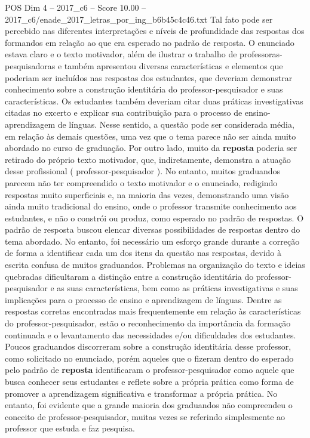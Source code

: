 \begin{textsample}{POS Dim 4 – 2017\_c6 – Score 10.00 – 2017\_c6/enade\_2017\_letras\_por\_ing\_b6b45c4c46.txt}
Tal fato pode ser percebido nas diferentes interpretações e níveis de profundidade das respostas dos formandos em relação ao que era esperado no padrão de resposta.
O enunciado estava claro e o texto motivador, além de ilustrar o trabalho de professoras-pesquisadoras e também apresentou diversas características e elementos que poderiam ser incluídos nas respostas dos estudantes, que deveriam demonstrar conhecimento sobre a construção identitária do professor-pesquisador e suas características.
Os estudantes também deveriam citar duas práticas investigativas citadas no excerto e explicar sua contribuição para o processo de ensino-aprendizagem de línguas.
Nesse sentido, a questão pode ser considerada média, em relação às demais questões, uma vez que o tema parece não ser ainda muito abordado no curso de graduação.
Por outro lado, muito da \textbf{reposta} poderia ser retirado do próprio texto motivador, que, indiretamente, demonstra a atuação desse profissional ( professor-pesquisador ).
No entanto, muitos graduandos parecem não ter compreendido o texto motivador e o enunciado, redigindo respostas muito superficiais e, na maioria das vezes, demonstrando uma visão ainda muito tradicional do ensino, onde o professor transmite conhecimento aos estudantes, e não o constrói ou produz, como esperado no padrão de respostas.
O padrão de resposta buscou elencar diversas possibilidades de respostas dentro do tema abordado.
No entanto, foi necessário um esforço grande durante a correção de forma a identificar cada um dos itens da questão nas respostas, devido à escrita confusa de muitos graduandos.
Problemas na organização do texto e ideias quebradas dificultaram a distinção entre a construção identitária do professor-pesquisador e as suas características, bem como as práticas investigativas e suas implicações para o processo de ensino e aprendizagem de línguas.
Dentre as respostas corretas encontradas mais frequentemente em relação às características do professor-pesquisador, estão o reconhecimento da importância da formação continuada e o levantamento das necessidades e/ou dificuldades dos estudantes.
Poucos graduandos discorreram sobre a construção identitária desse professor, como solicitado no enunciado, porém aqueles que o fizeram dentro do esperado pelo padrão de \textbf{reposta} identificaram o professor-pesquisador como aquele que busca conhecer seus estudantes e reflete sobre a própria prática como forma de promover a aprendizagem significativa e transformar a própria prática.
No entanto, foi evidente que a grande maioria dos graduandos não compreendeu o conceito de professor-pesquisador, muitas vezes se referindo simplesmente ao professor que estuda e faz pesquisa.

\end{textsample}
